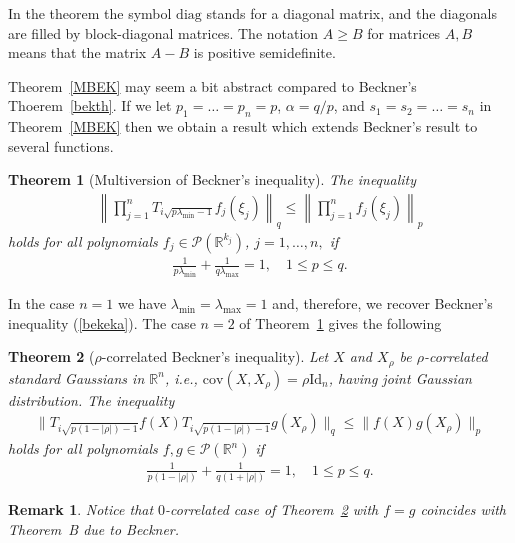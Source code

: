 \documentclass[9pt, a4paper]{amsart}
\newcommand{\1}{{\chi_{}}}%
\newtheorem{theorem}{Theorem}
\newtheorem{remark}{Remark}
\numberwithin{equation}{section}
\begin{document}
In the theorem the symbol $\mathrm{diag}$ stands for a diagonal matrix, and the diagonals are filled by block-diagonal matrices. The notation $A\geq B$ for matrices $A, B$ means that the matrix $A-B$ is positive semidefinite.
  

Theorem~\ref{MBEK} may seem a bit abstract compared to Beckner's Thoerem~\ref{bekth}. If we let $p_{1}=\ldots=p_{n}=p$, $\alpha =q/p$, and $s_{1}=s_{2}=\ldots=s_{n}$ in Theorem~\ref{MBEK} then we obtain a result which extends Beckner's result to several functions. 



\begin{theorem}[Multiversion of Beckner's inequality]\label{MBEKS} 
   The inequality 
    \begin{align}\label{MBEKSglob}
    \left\| \prod_{j=1}^{n} T_{i\sqrt{p \lambda_{\min}-1}}f_{j}(\xi_{j})\right\|_{q} \leq \left\| \prod_{j=1}^{n} f_{j}(\xi_{j})\right\|_{p}
    \end{align}
    holds for all polynomials $f_{j} \in \mathcal{P}(\mathbb{R}^{k_{j}})$, $j=1, \ldots, n,$ if 
    \begin{align}\label{MBEKSloc}
        \frac{1}{p \lambda_{\min}} + \frac{1}{q \lambda_{\max}}=1, \quad 1\leq p\leq q. 
    \end{align}
\end{theorem}
In the case $n=1$ we have $\lambda_{\min}=\lambda_{\max}=1$ and, therefore, we recover  Beckner's inequality (\ref{bekeka}). The case $n=2$ of Theorem~\ref{MBEKS} gives the following 
\begin{theorem}[$\rho$-correlated Beckner's inequality]\label{rcor}
Let $X$ and  $X_{\rho}$ be $\rho$-correlated standard Gaussians in $\mathbb{R}^{n}$, i.e., $\mathrm{cov}(X, X_{\rho})=\rho \mathrm{Id}_{n}$,  having joint Gaussian distribution. The inequality 
\begin{align*}
   \| T_{i\sqrt{p(1-|\rho|)-1}}f(X)T_{i\sqrt{p(1-|\rho|)-1}}g(X_{\rho})\|_{q} \leq \|f(X)g(X_{\rho})\|_{p}
\end{align*}
holds for all polynomials $f, g \in  \mathcal{P}(\mathbb{R}^{n})$  if 
\begin{align*}
    \frac{1}{p(1-|\rho|)}+\frac{1}{q(1+|\rho|)}=1, \quad 1\leq p\leq q. 
\end{align*}
\end{theorem}
\begin{remark}
    Notice that $0$-correlated case of Theorem~\ref{rcor} with $f=g$ coincides with Theorem~B due to Beckner. 
\end{remark}
\end{document}
